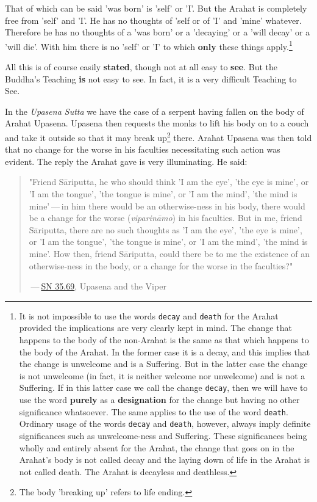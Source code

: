 That of which can be said 'was born' is 'self' or 'I'. But the Arahat is completely free from 'self' and 'I'. He has no thoughts of 'self or of 'I' and 'mine' whatever. Therefore he has no thoughts of a 'was born' or a 'decaying' or a 'will decay' or a 'will die'. With him there is no 'self' or 'I' to which \textbf{only} these things apply.\footnote{It is not impossible to use the words \texttt{\textquotesingle{}decay\textquotesingle{}} and \texttt{\textquotesingle{}death\textquotesingle{}} for the Arahat provided the implications are very clearly kept in mind. The change that happens to the body of the non-Arahat is the same as that which happens to the body of the Arahat. In the former case it is a decay, and this implies that the change is unwelcome and is a Suffering. But in the latter case the change is not unwelcome (in fact, it is neither welcome nor unwelcome) and is not a Suffering. If in this latter case we call the change \texttt{\textquotesingle{}decay\textquotesingle{}}, then we will have to use the word \textbf{purely} as a \textbf{designation} for the change but having no other significance whatsoever. The same applies to the use of the word \texttt{\textquotesingle{}death\textquotesingle{}}. Ordinary usage of the words \texttt{\textquotesingle{}decay\textquotesingle{}} and \texttt{\textquotesingle{}death\textquotesingle{}}, however, always imply definite significances such as unwelcome-ness and Suffering. These significances being wholly and entirely absent for the Arahat, the change that goes on in the Arahat's body is not called decay and the laying down of life in the Arahat is not called death. The Arahat is decayless and deathless.}

All this is of course easily \textbf{stated}, though not at all easy to \textbf{see}. But the Buddha's Teaching \textbf{is} not easy to see. In fact, it is a very difficult Teaching to See.

In the \emph{Upasena Sutta} we have the case of a serpent having fallen on the body of Arahat Upasena. Upasena then requests the monks to lift his body on to a couch and take it outside so that it may break up\footnote{The body 'breaking up' refers to life ending.} there. Arahat Upasena was then told that no change for the worse in his faculties necessitating such action was evident. The reply the Arahat gave is very illuminating. He said:

\begin{quote}
"Friend Sāriputta, he who should think 'I am the eye', 'the eye is mine', or 'I am the tongue', 'the tongue is mine', or 'I am the mind', 'the mind is mine' --- in him there would be an otherwise-ness in his body, there would be a change for the worse (\emph{viparināmo}) in his faculties. But in me, friend Sāriputta, there are no such thoughts as 'I am the eye', 'the eye is mine', or 'I am the tongue', 'the tongue is mine', or 'I am the mind', 'the mind is mine'. How then, friend Sāriputta, could there be to me the existence of an otherwise-ness in the body, or a change for the worse in the faculties?"

 --- \href{https://suttacentral.net/sn35.69/en/sujato}{SN 35.69}, Upasena and the Viper
\end{quote}

